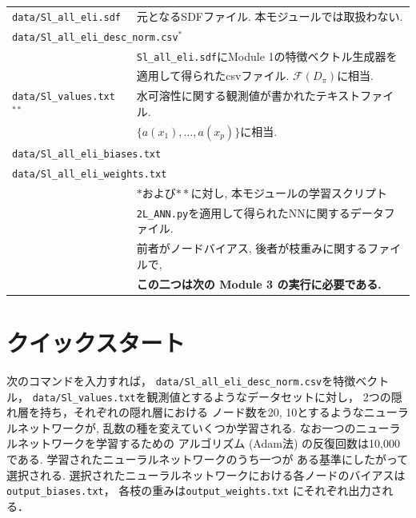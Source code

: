 \documentclass[11pt, titlepage, dvipdfmx, twoside]{jarticle}
\begin{document}
\begin{table}[h!]
\begin{tabular}{lcll}
  \multicolumn{2}{l}{\tt data/Sl\_all\_eli.sdf} & \multicolumn{2}{l}{元となるSDFファイル. 本モジュールでは取扱わない.}\\
  \multicolumn{4}{l}{{\tt data/Sl\_all\_eli\_desc\_norm.csv}$^{\ast}$} \\
  &&\multicolumn{2}{l}{{\tt Sl\_all\_eli.sdf}にModule 1の特徴ベクトル生成器を}\\
  &&\multicolumn{2}{l}{適用して得られたcsvファイル. ${\mathcal F}(D_\pi)$に相当.}\\
  \multicolumn{2}{l}{{\tt data/Sl\_values.txt}$^{\ast\ast}$} & \multicolumn{2}{l}{水可溶性に関する観測値が書かれたテキストファイル.}\\
  &&\multicolumn{2}{l}{$\{a(x_1),\dots,a(x_p)\}$に相当.}\\
  \multicolumn{4}{l}{\tt data/Sl\_all\_eli\_biases.txt} \\
  \multicolumn{4}{l}{\tt data/Sl\_all\_eli\_weights.txt}\\
  &&\multicolumn{2}{l}{$\ast$および$\ast\ast$に対し, 本モジュールの学習スクリプト}\\
  &&\multicolumn{2}{l}{{\tt 2L\_ANN.py}を適用して得られたNNに関するデータファイル.}\\
  &&\multicolumn{2}{l}{前者がノードバイアス, 後者が枝重みに関するファイルで,}\\
  &&\multicolumn{2}{l}{\bf この二つは次の Module 3 の実行に必要である.}\\
  \hline
  \end{tabular}
\end{table}



\clearpage
\section{クイックスタート}
\label{sec:quick}


次のコマンドを入力すれば，
\verb|data/Sl_all_eli_desc_norm.csv|を特徴ベクトル，
\verb|data/Sl_values.txt|を観測値とするようなデータセットに対し，
2つの隠れ層を持ち，それぞれの隠れ層における
ノード数を20, 10とするようなニューラルネットワークが,
乱数の種を変えていくつか学習される.
なお一つのニューラルネットワークを学習するための
アルゴリズム (Adam法) の反復回数は10,000である.
学習されたニューラルネットワークのうち一つが
ある基準にしたがって選択される. 
選択されたニューラルネットワークにおける各ノードのバイアスは
\verb|output_biases.txt|，
各枝の重みは\verb|output_weights.txt|
にそれぞれ出力される．
\end{document}
